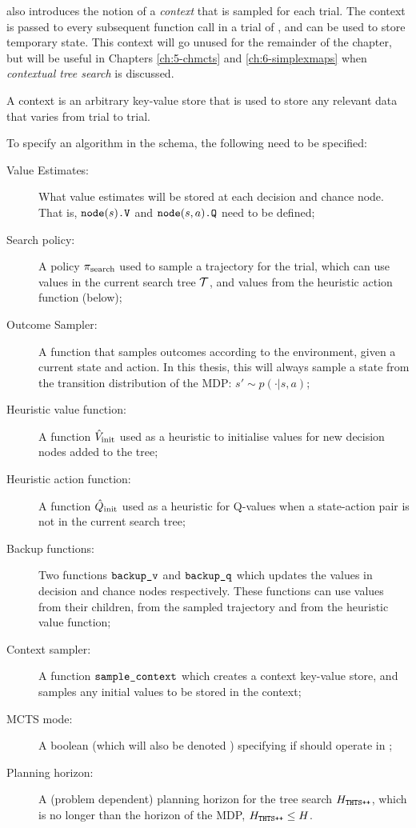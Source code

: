         \thtspp\ewe also introduces the notion of a \textit{context} that is sampled for each trial. The context is passed to every subsequent function call in a trial of \thtspp, and can be used to store temporary state. This context will go unused for the remainder of the chapter, but will be useful in Chapters \ref{ch:5-chmcts} and \ref{ch:6-simplexmaps} when \textit{contextual tree search} is discussed.
        \begin{defn}
            \label{def:2:thts_context}
            A \textnormal{context} is an arbitrary key-value store that is used to store any relevant data that varies from trial to trial.
        \end{defn}  

        To specify an algorithm in the \thtspp\ewe schema, the following need to be specified:
        \begin{description}
            \item[Value Estimates:]
                What value estimates will be stored at each decision and chance node. That is, ${{\textnormal{\texttt{node}}}(s)\textnormal{\texttt{.V}}}$ and ${{\textnormal{\texttt{node}}}(s,a)\textnormal{\texttt{.Q}}}$ need to be defined;
            \item[Search policy:]
                A policy ${\pi_{\textnormal{search}}}$ used to sample a trajectory for the trial, which can use values in the current search tree $\mathcal{T}$, and values from the heuristic action function (below);
            \item[Outcome Sampler:]
                A function \sampleoutcome\ewe that samples outcomes according to the environment, given a current state and action. In this thesis, this will always sample a state from the transition distribution of the MDP: $s'\sim p(\cdot|s,a)$;
            \item[Heuristic value function:]
                A function ${\hat{V}_{\textnormal{init}}}$ used as a heuristic to initialise values for new decision nodes added to the tree;
            \item[Heuristic action function:]
                A function ${\hat{Q}_{\textnormal{init}}}$ used as a heuristic for Q-values when a state-action pair is not in the current search tree;
            \item[Backup functions:]
                Two functions ${\textnormal{\texttt{backup\_v}}}$ and ${\textnormal{\texttt{backup\_q}}}$ which updates the values in decision and chance nodes respectively. These functions can use values from their children, from the sampled trajectory and from the heuristic value function;
            \item[Context sampler:]
                A function ${\textnormal{\texttt{sample\_context}}}$ which creates a context key-value store, and samples any initial values to be stored in the context;
            \item[MCTS mode:]
                A boolean (which will also be denoted \mctsmode) specifying if \thtspp\ewe should operate in \mctsmode;
            \item[Planning horizon:]
                 A (problem dependent) planning horizon for the tree search $H_{{\textnormal{\texttt{THTS++}}}}$, which is no longer than the horizon of the MDP, $H_{{\textnormal{\texttt{THTS++}}}}\leq H$.
        \end{description}
        
